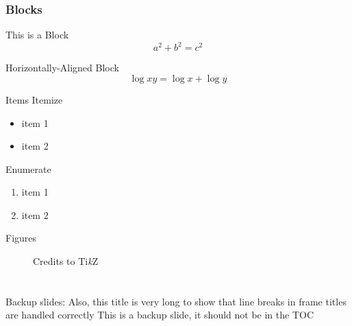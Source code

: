 \documentclass[compress]{beamer}
\begin{document}
\begin{frame}
  \frametitle{Blocks}
  \begin{block}{This is a Block}
    \[
      a^2 + b^2 = c^2
    \]
  \end{block}
  \centering
  \begin{minipage}{1.0\linewidth}
    \begin{block}{Horizontally-Aligned Block}
      \[
        \log xy = \log x + \log y
      \]
    \end{block}
  \end{minipage}
\end{frame}

\begin{frame}{Items}
  Itemize
  \begin{itemize}
    \item item 1
    \item item 2
  \end{itemize}

  \bigskip

  Enumerate
  \begin{enumerate}
    \item item 1
    \item item 2    
  \end{enumerate}
\end{frame}

\begin{frame}{Figures}
  \begin{figure}
    \centering
    \caption{Credits to Ti\textit{k}Z}
  \end{figure}
\end{frame}

\section*{} %

\begin{frame}{Backup slides: Also, this title is very long to show that line breaks in frame titles are handled correctly}
  This is a backup slide, it should not be in the TOC
\end{frame}
\end{document}
